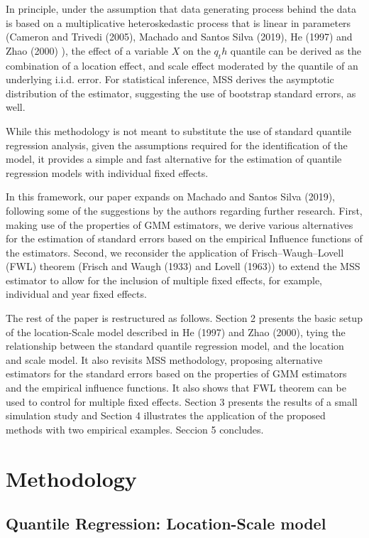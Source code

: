 \documentclass[
  letterpaper,
  DIV=11,
  numbers=noendperiod]{scrartcl}
\begin{document}
In principle, under the assumption that data generating process behind
the data is based on a multiplicative heteroskedastic process that is
linear in parameters (Cameron and Trivedi (2005), Machado and Santos
Silva (2019), He (1997) and Zhao (2000) ), the effect of a variable
\(X\) on the \(q_th\) quantile can be derived as the combination of a
location effect, and scale effect moderated by the quantile of an
underlying i.i.d. error. For statistical inference, MSS derives the
asymptotic distribution of the estimator, suggesting the use of
bootstrap standard errors, as well.

While this methodology is not meant to substitute the use of standard
quantile regression analysis, given the assumptions required for the
identification of the model, it provides a simple and fast alternative
for the estimation of quantile regression models with individual fixed
effects.

In this framework, our paper expands on Machado and Santos Silva (2019),
following some of the suggestions by the authors regarding further
research. First, making use of the properties of GMM estimators, we
derive various alternatives for the estimation of standard errors based
on the empirical Influence functions of the estimators. Second, we
reconsider the application of Frisch--Waugh--Lovell (FWL) theorem
(Frisch and Waugh (1933) and Lovell (1963)) to extend the MSS estimator
to allow for the inclusion of multiple fixed effects, for example,
individual and year fixed effects.

The rest of the paper is restructured as follows. Section 2 presents the
basic setup of the location-Scale model described in He (1997) and Zhao
(2000), tying the relationship between the standard quantile regression
model, and the location and scale model. It also revisits MSS
methodology, proposing alternative estimators for the standard errors
based on the properties of GMM estimators and the empirical influence
functions. It also shows that FWL theorem can be used to control for
multiple fixed effects. Section 3 presents the results of a small
simulation study and Section 4 illustrates the application of the
proposed methods with two empirical examples. Seccion 5 concludes.

\hypertarget{methodology}{%
\section{Methodology}\label{methodology}}

\hypertarget{quantile-regression-location-scale-model}{%
\subsection{Quantile Regression: Location-Scale
model}\label{quantile-regression-location-scale-model}}
\end{document}
